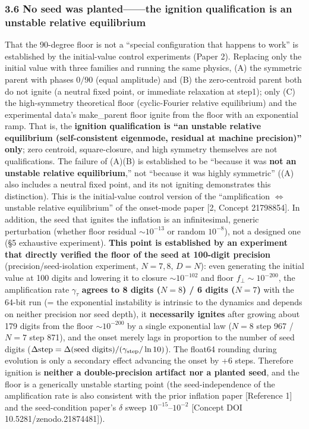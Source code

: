 \documentclass[
  a4paper,
]{ltjsarticle}
\begin{document}
\subsubsection{3.6 No seed was planted------the ignition qualification
is an unstable relative
equilibrium}\label{no-seed-was-plantedthe-ignition-qualification-is-an-unstable-relative-equilibrium}

That the 90-degree floor is not a ``special configuration that happens
to work'' is established by the initial-value control experiments (Paper
2). Replacing only the initial value with three families and running the
same physics, (A) the symmetric parent with phases \(0/90\) (equal
amplitude) and (B) the zero-centroid parent both do not ignite (a
neutral fixed point, or immediate relaxation at step1); only (C) the
high-symmetry theoretical floor (cyclic-Fourier relative equilibrium)
and the experimental data's make\_parent floor ignite from the floor
with an exponential ramp. That is, the \textbf{ignition qualification is
``an unstable relative equilibrium (self-consistent eigenmode, residual
at machine precision)'' only}; zero centroid, square-closure, and high
symmetry themselves are not qualifications. The failure of (A)(B) is
established to be ``because it was \textbf{not an unstable relative
equilibrium},'' not ``because it was highly symmetric'' ((A) also
includes a neutral fixed point, and its not igniting demonstrates this
distinction). This is the initial-value control version of the
``amplification \(\iff\) unstable relative equilibrium'' of the
onset-mode paper {[}2, Concept 21798854{]}. In addition, the seed that
ignites the inflation is an infinitesimal, generic perturbation (whether
floor residual \(\sim10^{-13}\) or random \(10^{-8}\)), not a designed
one (§5 exhaustive experiment). \textbf{This point is established by an
experiment that directly verified the floor of the seed at 100-digit
precision} (precision/seed-isolation experiment, \(N=7,8\), \(D=N\)):
even generating the initial value at 100 digits and lowering it to
closure \(\sim10^{-102}\) and floor \(f_\perp\sim10^{-200}\), the
amplification rate \(\gamma_\tau\) \textbf{agrees to 8 digits (\(N=8\))
/ 6 digits (\(N=7\))} with the 64-bit run (= the exponential instability
is intrinsic to the dynamics and depends on neither precision nor seed
depth), it \textbf{necessarily ignites} after growing about 179 digits
from the floor \(\sim10^{-200}\) by a single exponential law (\(N=8\)
step 967 / \(N=7\) step 871), and the onset merely lags in proportion to
the number of seed digits
(\(\Delta\text{step}=\Delta(\text{seed digits})/(\gamma_{\rm step}/\ln10)\)).
The float64 rounding during evolution is only a secondary effect
advancing the onset by +6 steps. Therefore ignition is \textbf{neither a
double-precision artifact nor a planted seed}, and the floor is a
generically unstable starting point (the seed-independence of the
amplification rate is also consistent with the prior inflation paper
{[}Reference 1{]} and the seed-condition paper's \(\delta\) sweep
\(10^{-15}\)--\(10^{-2}\) {[}Concept DOI 10.5281/zenodo.21874481{]}).
\end{document}

